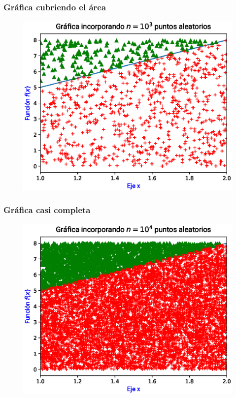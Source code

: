\documentclass[12pt]{beamer}
\begin{document}
\begin{frame}
\frametitle{Gráfica cubriendo el área}
\begin{figure}
    \centering
    \includegraphics[scale=0.55]{Imagenes/area_puntos_03.eps}
\end{figure}
\end{frame}
\begin{frame}
\frametitle{Gráfica casi completa}
\begin{figure}
    \centering
    \includegraphics[scale=0.55]{Imagenes/area_puntos_04.eps}
\end{figure}
\end{frame}
\end{document}
